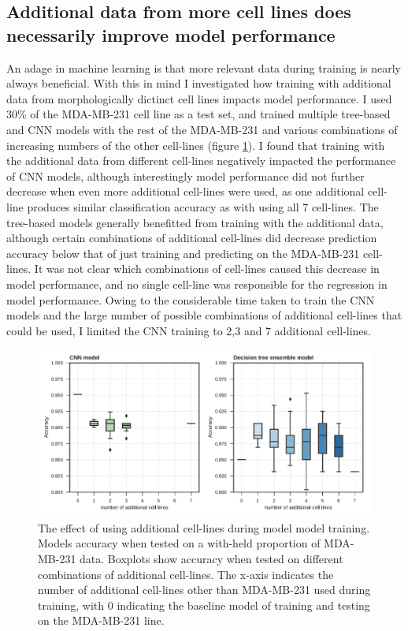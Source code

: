 \documentclass[a4paper,11pt,twoside,openright]{scrbook}
\begin{document}
\subsection{Additional data from more cell lines does necessarily improve model performance}

An adage in machine learning is that more relevant data during training is nearly always beneficial.
With this in mind I investigated how training with additional data from morphologically dictinct cell lines impacts model performance.
I used 30\% of the MDA-MB-231 cell line as a test set, and trained multiple tree-based and CNN models with the rest of the MDA-MB-231 and various combinations of increasing numbers of the other cell-lines (figure \ref{figure:cumulative_training}).
I found that training with the additional data from different cell-lines negatively impacted the performance of CNN models, although interestingly model performance did not further decrease when even more additional cell-lines were used, as one additional cell-line produces similar classification accuracy as with using all 7 cell-lines.
The tree-based models generally benefitted from training with the additional data, although certain combinations of additional cell-lines did decrease prediction accuracy below that of just training and predicting on the MDA-MB-231 cell-lines.
It was not clear which combinations of cell-lines caused this decrease in model performance, and no single cell-line was responsible for the regression in model performance.
Owing to the considerable time taken to train the CNN models and the large number of possible combinations of additional cell-lines that could be used, I limited the CNN training to 2,3 and 7 additional cell-lines.


\begin{figure}
    \includegraphics[width=1.0\textwidth]{ch2CumulativeTraining}
    \captionsetup{width=0.8\textwidth}
    \caption[The effect of using additional cell-lines during model training]{
        The effect of using additional cell-lines during model model training.
        Models accuracy when tested on a with-held proportion of MDA-MB-231 data.
        Boxplots show accuracy when tested on different combinations of additional cell-lines.
        The x-axis indicates the number of additional cell-lines other than MDA-MB-231 used during training, with 0 indicating the baseline model of training and testing on the MDA-MB-231 line.
    }
    \label{figure:cumulative_training}
\end{figure}
\end{document}
